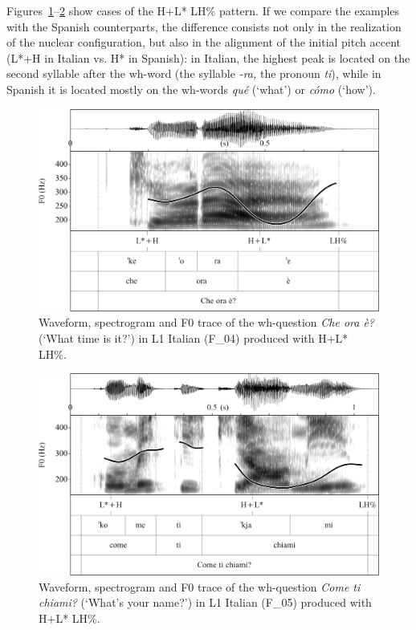 Figures~\ref{fig:4.97}--\ref{fig:4.98} show cases of the H+L* LH\% pattern. If we compare the examples with the Spanish counterparts, the difference consists not only in the realization of the nuclear configuration, but also in the alignment of the initial pitch accent (L*+H in Italian vs. H* in Spanish): in Italian, the highest peak is located on the second syllable after the wh-word (the syllable \textit{-ra,} the pronoun \textit{ti}), while in Spanish it is located mostly on the wh-words \textit{qué} (‘what’) or \textit{cómo} (‘how’).


\begin{figure}


\includegraphics[width=\textwidth]{figures/Figure_4.97.png}



\caption{Waveform, spectrogram and F0 trace of the wh-question \textit{Che ora è?} (‘What time is it?’) in L1 Italian (F\_04) produced with H+L* LH\%.}
\label{fig:4.97}
\end{figure}

\begin{figure}


\includegraphics[width=\textwidth]{figures/Figure_4.98.png}



\caption{Waveform, spectrogram and F0 trace of the wh-question \textit{Come ti chiami?} (‘What’s your name?’) in L1 Italian (F\_05) produced with H+L* LH\%.}
\label{fig:4.98}
\end{figure}

